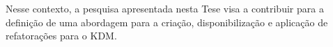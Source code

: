 Nesse contexto, a pesquisa apresentada nesta Tese visa a contribuir para a definição de uma abordagem para a criação, disponibilização e aplicação de refatorações para o KDM.


%


    
    

